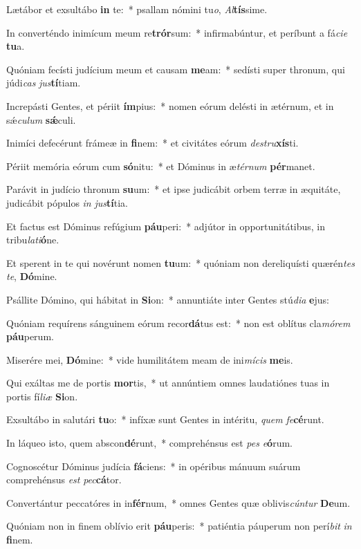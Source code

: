 \item Lætábor et exsultábo \textbf{in} te:~* psallam nómini tu\textit{o}, \textit{Al}\textbf{tís}sime.
\item In converténdo inimícum meum re\textbf{trór}sum:~* infirmabúntur, et períbunt a fá\textit{ci}\textit{e} \textbf{tu}a.
\item Quóniam fecísti judícium meum et causam \textbf{me}am:~* sedísti super thronum, qui júdi\textit{cas} \textit{jus}\textbf{tí}tiam.
\item Increpásti Gentes, et périit \textbf{ím}pius:~* nomen eórum delésti in ætérnum, et in sǽ\textit{cu}\textit{lum} \textbf{sǽ}culi.
\item Inimíci defecérunt frámeæ in \textbf{fi}nem:~* et civitátes eórum \textit{de}\textit{stru}\textbf{xís}ti.
\item Périit memória eórum cum \textbf{só}nitu:~* et Dóminus in æ\textit{tér}\textit{num} \textbf{pér}manet.
\item Parávit in judício thronum \textbf{su}um:~* et ipse judicábit orbem terræ in æquitáte, judicábit pópulos \textit{in} \textit{jus}\textbf{tí}tia.
\item Et factus est Dóminus refúgium \textbf{páu}peri:~* adjútor in opportunitátibus, in tribu\textit{la}\textit{ti}\textbf{ó}ne.
\item Et sperent in te qui novérunt nomen \textbf{tu}um:~* quóniam non dereliquísti quærén\textit{tes} \textit{te}, \textbf{Dó}mine.
\item Psállite Dómino, qui hábitat in \textbf{Si}on:~* annuntiáte inter Gentes stú\textit{di}\textit{a} \textbf{e}jus:
\item Quóniam requírens sánguinem eórum recor\textbf{dá}tus est:~* non est oblítus cla\textit{mó}\textit{rem} \textbf{páu}perum.
\item Miserére mei, \textbf{Dó}mine:~* vide humilitátem meam de ini\textit{mí}\textit{cis} \textbf{me}is.
\item Qui exáltas me de portis \textbf{mor}tis,~* ut annúntiem omnes laudatiónes tuas in portis fí\textit{li}\textit{æ} \textbf{Si}on.
\item Exsultábo in salutári \textbf{tu}o:~* infíxæ sunt Gentes in intéritu, \textit{quem} \textit{fe}\textbf{cé}runt.
\item In láqueo isto, quem abscon\textbf{dé}runt,~* comprehénsus est \textit{pes} \textit{e}\textbf{ó}rum.
\item Cognoscétur Dóminus judícia \textbf{fá}ciens:~* in opéribus mánuum suárum comprehénsus \textit{est} \textit{pec}\textbf{cá}tor.
\item Convertántur peccatóres in in\textbf{fér}num,~* omnes Gentes quæ oblivis\textit{cún}\textit{tur} \textbf{De}um.
\item Quóniam non in finem oblívio erit \textbf{páu}peris:~* patiéntia páuperum non perí\textit{bit} \textit{in} \textbf{fi}nem.

